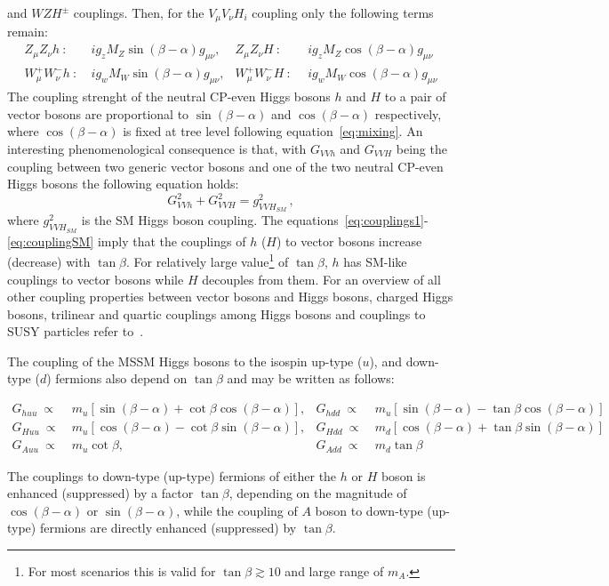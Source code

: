 and $WZH^{\pm}$ couplings. Then, for the $V_{\mu}V_{\nu}H_i$ coupling only the following terms remain:
\begin{align} 
Z_{\mu}Z_{\nu} h ~ :  ~ & ig_z M_Z \sin(\beta -\alpha) g_{\mu\nu},  &  Z_{\mu}Z_{\nu} H ~ : ~  ~    & ig_z M_Z \cos(\beta -\alpha) g_{\mu\nu} \label{eq:couplings1} \\ 
W_{\mu}^+W_{\nu}^- h ~: ~&  ig_w M_W \sin(\beta -\alpha) g_{\mu\nu},  &  W_{\mu}^+W_{\nu}^- H ~ : ~ ~ & ig_w M_W \cos(\beta -\alpha) g_{\mu\nu} \label{eq:couplings2} 
\end{align}
The coupling strenght of the neutral CP-even Higgs bosons $h$ and $H$ to a pair of vector bosons are proportional to $\sin(\beta -\alpha)$ and $\cos(\beta -\alpha)$
respectively, where $\cos(\beta -\alpha)$ is fixed at tree level following equation~\eqref{eq:mixing}. An interesting phenomenological consequence is
that, with $G_{VVh}$ and $G_{VVH}$ being the coupling between two generic vector bosons and one of the two neutral CP-even Higgs bosons the following equation holds:
\begin{equation}\label{eq:couplingSM}
G^2_{VVh} +G^2_{VVH} = g^2_{VVH_{SM} }\,, 
\end{equation}
where $g^2_{VVH_{SM}}$ is the SM Higgs boson coupling. 
The equations~\eqref{eq:couplings1}-\eqref{eq:couplingSM} imply that the couplings of $h$ ($H$) to  vector bosons 
increase (decrease) with $\tan\beta$. For relatively large value\footnote{For most scenarios this is valid for  $\tan\beta \apprge 10$ 
 and large range of $m_A$.} 
of $\tan\beta$, $h$ has SM-like couplings to vector bosons while
 $H$  decouples from them. For an overview of all  other
coupling properties  between vector bosons and Higgs bosons, charged Higgs bosons, trilinear and quartic couplings among Higgs bosons and couplings 
to SUSY particles refer to~\cite{Djuadi}.

The coupling of the MSSM Higgs bosons to the isospin up-type ($u$), and down-type ($d$) fermions also depend on $\tan\beta$ and may be written
as follows:
\begin{small}
\begin{align*}
G_{huu} ~\propto ~ & m_u [\sin(\beta - \alpha)  + \cot\beta \cos(\beta - \alpha)], & G_{hdd} ~\propto ~ & m_u [\sin(\beta - \alpha)  - \tan\beta \cos(\beta - \alpha)]\\
G_{Huu} ~\propto ~& m_u [\cos(\beta - \alpha)  - \cot\beta \sin(\beta - \alpha)], & G_{Hdd} ~\propto~  & m_d [\cos(\beta - \alpha)  + \tan\beta \sin(\beta - \alpha)]\\
G_{Auu} ~ \propto ~ & m_u  \cot\beta, & G_{Add} ~ \propto ~ & m_d \tan\beta 
\end{align*} 
\end{small}
The couplings to down-type (up-type) fermions of either the $h$ or $H$ boson is enhanced (suppressed) by a factor $\tan\beta$, depending
on the magnitude of $\cos(\beta - \alpha)$ or $\sin(\beta - \alpha)$, while the coupling of $A$ boson to down-type (up-type) fermions are directly 
enhanced (suppressed) by $\tan\beta$.


